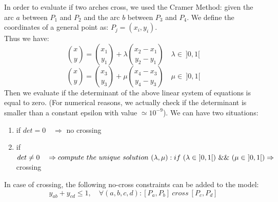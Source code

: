 In order to evaluate if two arches cross, we used the Cramer Method: given the arc $a$ between $P_1$ and $P_2$ and the arc $b$ between $P_3$ and $P_4$. We define the coordinates of a general point as: $P_j = (x_i, y_i)$. \\
Thus we have:
\[
{x \choose y} = {x_1 \choose y_1}+ \lambda {x_2 - x_1 \choose y_2 - y_1} \quad \lambda \in \ ]0, 1[
\]   
\[
{x \choose y} = {x_3 \choose y_3}+ \mu {x_4 - x_3 \choose y_4 - y_3} \quad \mu \in \ ]0, 1[
\]    
Then we evaluate if the determinant of the above linear system of equations is equal to zero. (For numerical reasons, we actually check if the determinant is smaller than a constant epsilon with value $\simeq 10^{-9}$). We can have two situations:
\begin{enumerate}
\item if $det=0 \quad \Rightarrow$ no crossing 
\item if $det \neq 0 \quad \Rightarrow compute \ the \ unique \ solution \ (\lambda, \mu): \\ if \ (\lambda \in \ ]0, 1[) \ \&\& \ (\mu \in \ ]0, 1[) \Rightarrow $ crossing
\end{enumerate}                                                   
In case of crossing, the following no-cross constraints can be added to the model: 
\[
y_{ab}+ y_{cd} \leq 1, \quad \forall (a,b,c,d): [P_a, P_b] \ cross \ [P_c, P_d]
\]

